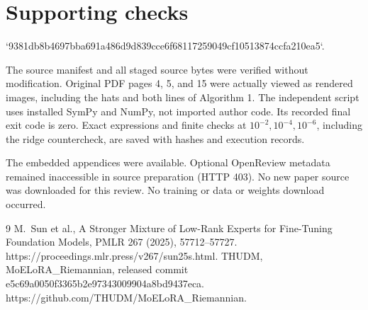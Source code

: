 \documentclass[10pt]{article}
\begin{document}
\section*{Supporting checks}
`9381db8b4697bba691a486d9d839cce6f68117259049cf10513874ccfa210ea5`.\par
The source manifest and all staged source bytes were verified without modification. Original PDF pages 4, 5, and 15 were actually viewed as rendered images, including the hats and both lines of Algorithm 1. The independent script uses installed SymPy and NumPy, not imported author code. Its recorded final exit code is zero. Exact expressions and finite checks at \(10^{-2},10^{-4},10^{-6}\), including the ridge countercheck, are saved with hashes and execution records.\par
The embedded appendices were available. Optional OpenReview metadata remained inaccessible in source preparation (HTTP 403). No new paper source was downloaded for this review. No training or data or weights download occurred.\par
9 M. Sun et al., A Stronger Mixture of Low-Rank Experts for Fine-Tuning Foundation Models, PMLR 267 (2025), 57712–57727. https://proceedings.mlr.press/v267/sun25s.html. THUDM, MoELoRA\_Riemannian, released commit e5c69a0050f3365b2e97343009904a8bd9437eca. https://github.com/THUDM/MoELoRA\_Riemannian.\par
\end{document}
